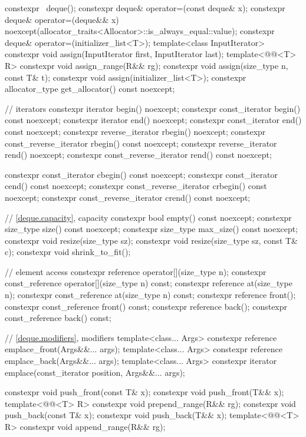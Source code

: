 \begin{codeblock}
{{    constexpr ~deque();
    constexpr deque& operator=(const deque& x);
    constexpr deque& operator=(deque&& x)
      noexcept(allocator_traits<Allocator>::is_always_equal::value);
    constexpr deque& operator=(initializer_list<T>);
    template<class InputIterator>
      constexpr void assign(InputIterator first, InputIterator last);
    template<@@<T> R>
      constexpr void assign_range(R&& rg);
    constexpr void assign(size_type n, const T& t);
    constexpr void assign(initializer_list<T>);
    constexpr allocator_type get_allocator() const noexcept;

    // iterators
    constexpr iterator               begin() noexcept;
    constexpr const_iterator         begin() const noexcept;
    constexpr iterator               end() noexcept;
    constexpr const_iterator         end() const noexcept;
    constexpr reverse_iterator       rbegin() noexcept;
    constexpr const_reverse_iterator rbegin() const noexcept;
    constexpr reverse_iterator       rend() noexcept;
    constexpr const_reverse_iterator rend() const noexcept;

    constexpr const_iterator         cbegin() const noexcept;
    constexpr const_iterator         cend() const noexcept;
    constexpr const_reverse_iterator crbegin() const noexcept;
    constexpr const_reverse_iterator crend() const noexcept;

    // \ref{deque.capacity}, capacity
    constexpr bool empty() const noexcept;
    constexpr size_type size() const noexcept;
    constexpr size_type max_size() const noexcept;
    constexpr void      resize(size_type sz);
    constexpr void      resize(size_type sz, const T& c);
    constexpr void      shrink_to_fit();

    // element access
    constexpr reference       operator[](size_type n);
    constexpr const_reference operator[](size_type n) const;
    constexpr reference       at(size_type n);
    constexpr const_reference at(size_type n) const;
    constexpr reference       front();
    constexpr const_reference front() const;
    constexpr reference       back();
    constexpr const_reference back() const;

    // \ref{deque.modifiers}, modifiers
    template<class... Args> constexpr reference emplace_front(Args&&... args);
    template<class... Args> constexpr reference emplace_back(Args&&... args);
    template<class... Args> constexpr iterator emplace(const_iterator position, Args&&... args);

    constexpr void push_front(const T& x);
    constexpr void push_front(T&& x);
    template<@@<T> R>
      constexpr void prepend_range(R&& rg);
    constexpr void push_back(const T& x);
    constexpr void push_back(T&& x);
    template<@@<T> R>
      constexpr void append_range(R&& rg);

}}
\end{codeblock}
